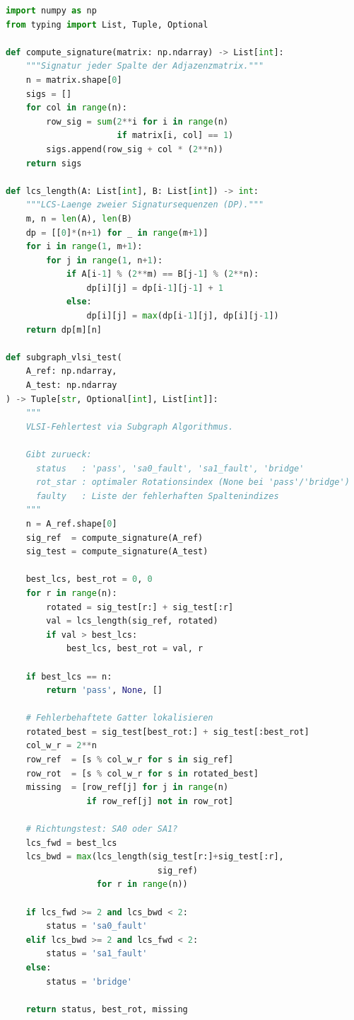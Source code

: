 ﻿\documentclass[a4paper,12pt]{article}
\theoremstyle{definition}
\begin{document}
\begin{lstlisting}[language=Python,
                   caption={Signaturberechnung und Rotationssuche für VLSI-Schaltkreisgraphen}]
import numpy as np
from typing import List, Tuple, Optional

def compute_signature(matrix: np.ndarray) -> List[int]:
    """Signatur jeder Spalte der Adjazenzmatrix."""
    n = matrix.shape[0]
    sigs = []
    for col in range(n):
        row_sig = sum(2**i for i in range(n)
                      if matrix[i, col] == 1)
        sigs.append(row_sig + col * (2**n))
    return sigs

def lcs_length(A: List[int], B: List[int]) -> int:
    """LCS-Laenge zweier Signatursequenzen (DP)."""
    m, n = len(A), len(B)
    dp = [[0]*(n+1) for _ in range(m+1)]
    for i in range(1, m+1):
        for j in range(1, n+1):
            if A[i-1] % (2**m) == B[j-1] % (2**n):
                dp[i][j] = dp[i-1][j-1] + 1
            else:
                dp[i][j] = max(dp[i-1][j], dp[i][j-1])
    return dp[m][n]

def subgraph_vlsi_test(
    A_ref: np.ndarray,
    A_test: np.ndarray
) -> Tuple[str, Optional[int], List[int]]:
    """
    VLSI-Fehlertest via Subgraph Algorithmus.

    Gibt zurueck:
      status   : 'pass', 'sa0_fault', 'sa1_fault', 'bridge'
      rot_star : optimaler Rotationsindex (None bei 'pass'/'bridge')
      faulty   : Liste der fehlerhaften Spaltenindizes
    """
    n = A_ref.shape[0]
    sig_ref  = compute_signature(A_ref)
    sig_test = compute_signature(A_test)

    best_lcs, best_rot = 0, 0
    for r in range(n):
        rotated = sig_test[r:] + sig_test[:r]
        val = lcs_length(sig_ref, rotated)
        if val > best_lcs:
            best_lcs, best_rot = val, r

    if best_lcs == n:
        return 'pass', None, []

    # Fehlerbehaftete Gatter lokalisieren
    rotated_best = sig_test[best_rot:] + sig_test[:best_rot]
    col_w_r = 2**n
    row_ref  = [s % col_w_r for s in sig_ref]
    row_rot  = [s % col_w_r for s in rotated_best]
    missing  = [row_ref[j] for j in range(n)
                if row_ref[j] not in row_rot]

    # Richtungstest: SA0 oder SA1?
    lcs_fwd = best_lcs
    lcs_bwd = max(lcs_length(sig_test[r:]+sig_test[:r],
                              sig_ref)
                  for r in range(n))

    if lcs_fwd >= 2 and lcs_bwd < 2:
        status = 'sa0_fault'
    elif lcs_bwd >= 2 and lcs_fwd < 2:
        status = 'sa1_fault'
    else:
        status = 'bridge'

    return status, best_rot, missing
\end{lstlisting}
\end{document}
